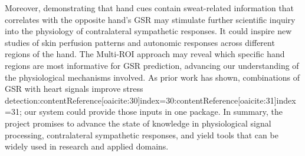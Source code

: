 \documentclass[12pt]{article}
\begin{document}
    Moreover, demonstrating that hand cues contain sweat-related information that correlates with the opposite hand's GSR may stimulate further scientific inquiry into the physiology of contralateral sympathetic responses. It could inspire new studies of skin perfusion patterns and autonomic responses across different regions of the hand. The Multi-ROI approach may reveal which specific hand regions are most informative for GSR prediction, advancing our understanding of the physiological mechanisms involved. As prior work has shown, combinations of GSR with heart signals improve stress detection:contentReference[oaicite:30]{index=30}:contentReference[oaicite:31]{index=31}; our system could provide those inputs in one package. In summary, the project promises to advance the state of knowledge in physiological signal processing, contralateral sympathetic responses, and yield tools that can be widely used in research and applied domains.
\end{document}
